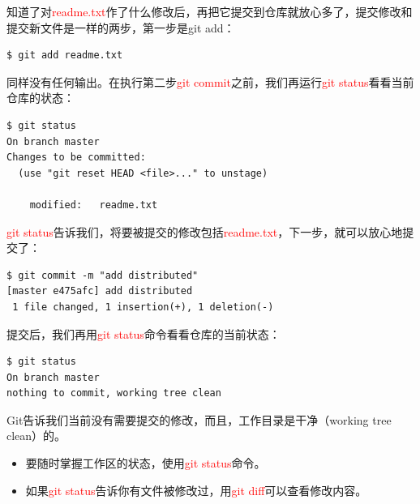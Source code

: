 知道了对\textcolor{red}{readme.txt}作了什么修改后，再把它提交到仓库就放心多了，提交修改和提交新文件是一样的两步，第一步是git add：

\begin{verbatim}
$ git add readme.txt
\end{verbatim}

同样没有任何输出。在执行第二步\textcolor{red}{git commit}之前，我们再运行\textcolor{red}{git status}看看当前仓库的状态：

\begin{verbatim}
$ git status
On branch master
Changes to be committed:
  (use "git reset HEAD <file>..." to unstage)

	modified:   readme.txt
\end{verbatim}

\textcolor{red}{git status}告诉我们，将要被提交的修改包括\textcolor{red}{readme.txt}，下一步，就可以放心地提交了：

\begin{verbatim}
$ git commit -m "add distributed"
[master e475afc] add distributed
 1 file changed, 1 insertion(+), 1 deletion(-)
\end{verbatim}

提交后，我们再用\textcolor{red}{git status}命令看看仓库的当前状态：

\begin{verbatim}
$ git status
On branch master
nothing to commit, working tree clean
\end{verbatim}

Git告诉我们当前没有需要提交的修改，而且，工作目录是干净（working tree clean）的。

\begin{tcolorbox}
\begin{itemize}
  \item 要随时掌握工作区的状态，使用\textcolor{red}{git status}命令。
  \item 如果\textcolor{red}{git status}告诉你有文件被修改过，用\textcolor{red}{git diff}可以查看修改内容。
\end{itemize}
\end{tcolorbox}


